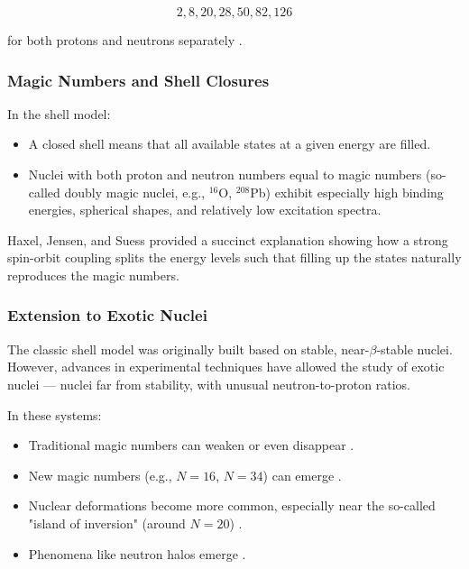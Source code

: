 \[2,8,20,28,50,82,126\]

for both protons and neutrons separately \cite{haxel_magic_nodate,mayer_shell_1968}.


\subsubsection{Magic Numbers and Shell Closures}

In the shell model:

\begin{itemize}
	\item A closed shell means that all available states at a given energy are filled.
	\item Nuclei with both proton and neutron numbers equal to magic numbers (so-called doubly magic nuclei, e.g., $^{16}$O, $^{208}$Pb) exhibit especially high binding energies, spherical shapes, and relatively low excitation spectra.
\end{itemize}

Haxel, Jensen, and Suess \cite{haxel_magic_nodate} provided a succinct explanation showing how a strong spin-orbit coupling splits the energy levels such that filling up the states naturally reproduces the magic numbers.


\subsubsection{Extension to Exotic Nuclei}

The classic shell model was originally built based on stable, near-$\beta$-stable nuclei. However, advances in experimental techniques have allowed the study of exotic nuclei — nuclei far from stability, with unusual neutron-to-proton ratios.

In these systems:

\begin{itemize}
	\item Traditional magic numbers can weaken or even disappear \cite{otsuka_evolution_2020}.
	\item New magic numbers (e.g., $N=16$, $N=34$) can emerge \cite{otsuka_evolution_2020}.
	\item Nuclear deformations become more common, especially near the so-called "island of inversion" (around $N=20$) \cite{otsuka_evolution_2020}.
	\item Phenomena like neutron halos emerge \cite{otsuka_evolution_2020}.
\end{itemize}

